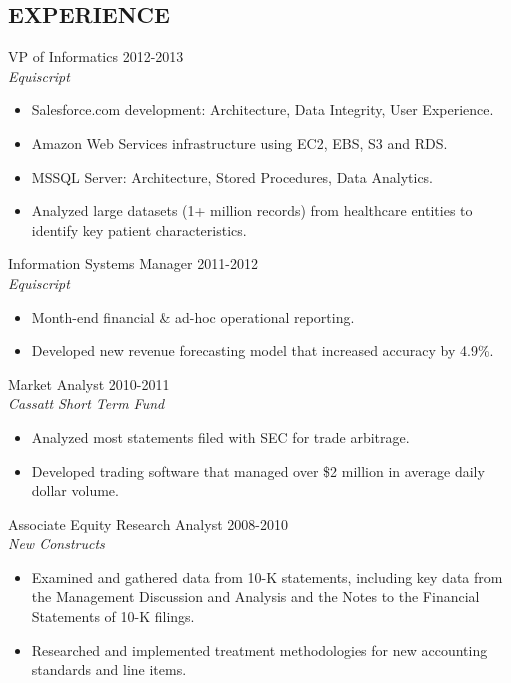 \documentclass[line, margin]{res}
\begin{document}
\begin{resume}
\section{EXPERIENCE}
{\large VP of Informatics} \hfill 2012-2013\\
\textit{Equiscript}
\begin{itemize}[leftmargin=10pt]
\item Salesforce.com development: Architecture, Data Integrity, User Experience. 
\item Amazon Web Services infrastructure using EC2, EBS, S3 and RDS.
\item MSSQL Server: Architecture, Stored Procedures, Data Analytics.
\item Analyzed large datasets (1+ million records) from healthcare entities to identify key patient characteristics.
\end{itemize}

{\large Information Systems Manager} \hfill 2011-2012\\
\textit{Equiscript}
\begin{itemize}[leftmargin=10pt]
\item Month-end financial \& ad-hoc operational reporting.
\item Developed new revenue forecasting model that increased accuracy by 4.9\%.
\end{itemize}

{\large Market Analyst} \hfill 2010-2011\\
\textit{Cassatt Short Term Fund}
\begin{itemize}[leftmargin=10pt]
\item  Analyzed most statements filed with SEC for trade arbitrage.
\item Developed trading software that managed over \$2 million in average daily dollar volume.
\end{itemize}
 
{\large Associate Equity Research Analyst} \hfill 2008-2010\\
\textit{New Constructs}
\begin{itemize}[leftmargin=10pt]
\item Examined and gathered data from 10-K statements, including key data from the Management Discussion and Analysis and the Notes to the Financial Statements of 10-K filings.
\item Researched and implemented treatment methodologies for new accounting standards and line items.
\end{itemize}

\end{resume}
\end{document}
